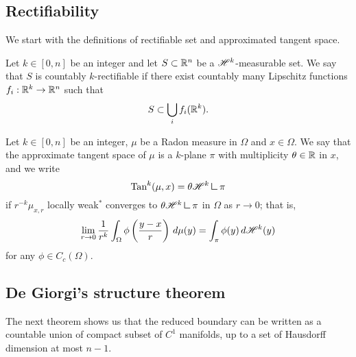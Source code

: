 \subsection{Rectifiability}

We start with the definitions of rectifiable set and approximated tangent space.

\begin{definition}
Let $k \in [0, n]$ be an integer and let $S \subset \mathbb{R}^{n}$ be a $\mathscr{H}^{k}$-measurable set. We say that $S$ is countably $k$-rectifiable if there exist countably many Lipschitz functions $f_{i} : \mathbb{R}^{k} \to \mathbb{R}^{n}$ such that 
\begin{equation*}
S \subset \bigcup_{i} f_{i}(\mathbb{R}^{k}).
\end{equation*}
\end{definition}

\begin{definition}
Let $k \in [0, n]$ be an integer, $\mu$ be a Radon measure in $\Omega$ and $x \in \Omega$. We say that the approximate tangent space of $\mu$ is a $k$-plane $\pi$ with multiplicity $\theta \in \mathbb{R}$ in $x$, and we write 
\begin{equation*}
\Tan^{k}(\mu, x) = \theta \Haus{k} \res \pi
\end{equation*}
if $r^{-k} \mu_{x, r}$ locally weak$^*$ converges to $\theta \Haus{k} \res \pi$ in $\Omega$ as $r \to 0$; that is, 
\begin{equation*}
\lim_{r \to 0} \frac{1}{r^{k}} \int_{\Omega} \phi\left (\frac{y - x}{r}\right) \, d \mu(y) = \int_{\pi} \phi(y) \, d \mathscr{H}^{k}(y)
\end{equation*}
for any $\phi \in C_{c}(\Omega)$.
\end{definition}

\subsection{De Giorgi's structure theorem}

The next theorem shows us that the reduced boundary can be written as a countable union of compact subset of $C^{1}$ manifolds, up to a set of Hausdorff dimension at most $n-1$. 


